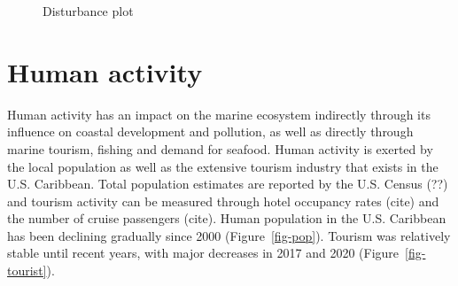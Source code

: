 \documentclass[
  letterpaper,
  oneside,
  open=any]{scrbook}
\begin{document}
\begin{figure}


\caption{\label{fig-dist}Disturbance plot}

\end{figure}%

\section{Human activity}\label{human-activity}

Human activity has an impact on the marine ecosystem indirectly through
its influence on coastal development and pollution, as well as directly
through marine tourism, fishing and demand for seafood. Human activity
is exerted by the local population as well as the extensive tourism
industry that exists in the U.S. Caribbean. Total population estimates
are reported by the U.S. Census (??) and tourism activity can be
measured through hotel occupancy rates (cite) and the number of cruise
passengers (cite). Human population in the U.S. Caribbean has been
declining gradually since 2000 (Figure~\ref{fig-pop}). Tourism was
relatively stable until recent years, with major decreases in 2017 and
2020 (Figure~\ref{fig-tourist}).
\end{document}
